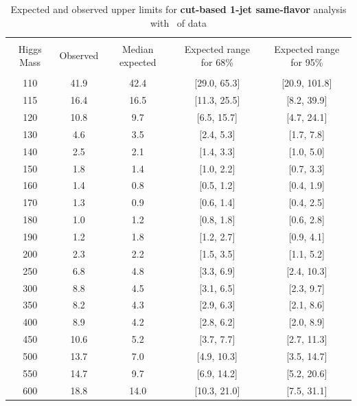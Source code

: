 \begin{table}[!hbp]
\begin{center}
\begin{tabular}{c c c c c}
\hline
\vspace{-3mm} && \\
 Higgs Mass   & Observed & Median expected & Expected range for 68\% & Expected range for 95\%   \\
\vspace{-3mm} && \\
\hline
110 & 41.9 & 42.4 & [29.0, 65.3] & [20.9, 101.8] \\
115 & 16.4 & 16.5 & [11.3, 25.5] & [8.2, 39.9] \\
120 & 10.8 & 9.7 & [6.5, 15.7] & [4.7, 24.1] \\
130 & 4.6 & 3.5 & [2.4, 5.3] & [1.7, 7.8] \\
140 & 2.5 & 2.1 & [1.4, 3.3] & [1.0, 5.0] \\
150 & 1.8 & 1.4 & [1.0, 2.2] & [0.7, 3.3] \\
160 & 1.4 & 0.8 & [0.5, 1.2] & [0.4, 1.9] \\
170 & 1.3 & 0.9 & [0.6, 1.4] & [0.4, 2.5] \\
180 & 1.0 & 1.2 & [0.8, 1.8] & [0.6, 2.8] \\
190 & 1.2 & 1.8 & [1.2, 2.7] & [0.9, 4.1] \\
200 & 2.3 & 2.2 & [1.5, 3.5] & [1.1, 5.2] \\
250 & 6.8 & 4.8 & [3.3, 6.9] & [2.4, 10.3] \\
300 & 8.8 & 4.5 & [3.1, 6.5] & [2.3, 9.7] \\
350 & 8.2 & 4.3 & [2.9, 6.3] & [2.1, 8.6] \\
400 & 8.9 & 4.2 & [2.8, 6.2] & [2.0, 8.9] \\
450 & 10.6 & 5.2 & [3.7, 7.7] & [2.7, 11.3] \\
500 & 13.7 & 7.0 & [4.9, 10.3] & [3.5, 14.7] \\
550 & 14.7 & 9.7 & [6.9, 14.2] & [5.2, 20.6] \\
600 & 18.8 & 14.0 & [10.3, 21.0] & [7.5, 31.1] \\
\hline
\end{tabular}
\caption{Expected and observed upper limits for {\bf cut-based 1-jet
    same-flavor} analysis with \intlumi\ of data}
\label{tab:sf1_cut}
\end{center}
\end{table}

